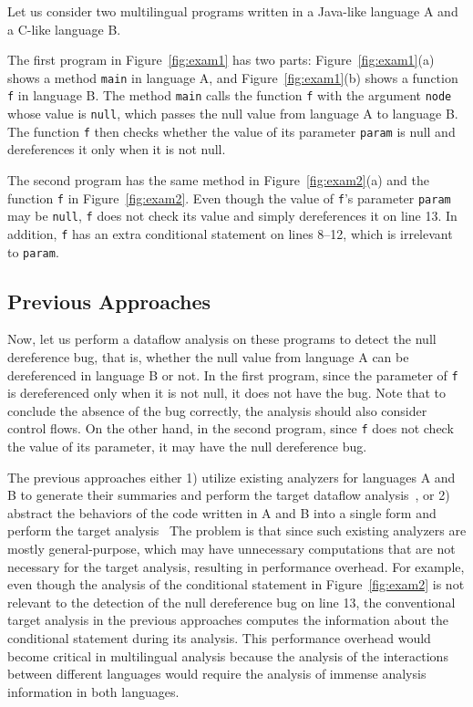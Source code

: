 Let us consider two multilingual programs written in a Java-like language A
and a C-like language B.

The first program in Figure~\ref{fig:exam1} has two parts:
Figure~\ref{fig:exam1}(a) shows a method \texttt{main} in language A,
and Figure~\ref{fig:exam1}(b) shows a function \texttt{f} in language B.
The method \texttt{main} calls the function \texttt{f} with the argument
\texttt{node} whose value is \texttt{null}, which passes the null
value from language A to language B. The function \texttt{f} then
checks whether the value of its parameter \texttt{param} is null
and dereferences it only when it is not null.

The second program has the same method in Figure~\ref{fig:exam2}(a)
and the function \texttt{f} in Figure~\ref{fig:exam2}.
Even though the value of \texttt{f}'s parameter \texttt{param} may be \texttt{null},
\texttt{f} does not check its value and simply dereferences it on line 13.
In addition, \texttt{f} has an extra conditional statement on lines 8--12,
which is irrelevant to \texttt{param}.

\subsection{Previous Approaches}
Now, let us perform a dataflow analysis on these programs to detect
the null dereference bug, that is, whether the null value from
language A can be dereferenced in language B or not.
In the first program, since the parameter of \texttt{f} is
dereferenced only when it is not null, it does not have the bug.
Note that to conclude the absence of the bug correctly,
the analysis should also consider control flows.
On the other hand, in the second program, since \texttt{f} does not
check the value of its parameter, it may have the null dereference bug.

The previous approaches either 1) utilize existing analyzers for
languages A and B to generate their summaries and perform the
target dataflow analysis~\cite{LeeASE20,JN-SAF}, or 2) abstract 
the behaviors of the code written in A and B into a single form and
perform the target analysis~\cite{hybridroid,cpython}
The problem is that since such existing analyzers are mostly general-purpose,
which may have unnecessary computations that are not necessary for the target analysis,
resulting in performance overhead.
For example, even though the analysis of the conditional statement in Figure~\ref{fig:exam2}
is not relevant to the detection of the null dereference bug on line 13,
the conventional target analysis in the previous approaches computes
the information about the conditional statement during its analysis.
This performance overhead would become critical in multilingual analysis
because the analysis of the interactions between different languages would require
the analysis of immense analysis information in both languages.


